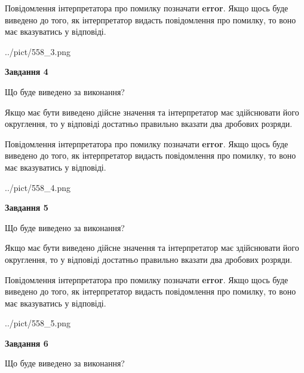 \documentclass[12pt, ukrainian]{article}
\begin{document}
{\begin {Large}
Повідомлення інтерпретатора про помилку позначати \textbf{error}.
Якщо щось буде виведено до того, як інтерпретатор видасть повідомлення про помилку, 
то воно має вказуватись у відповіді. \par

\begin{center}
	{../pict/558_3.png}
\end{center}
\newpage

{\begin {center}\textbf{Завдання 4}\end {center}}\par
Що буде виведено за виконання? \par

Якщо має бути виведено дійсне значення та інтерпретатор має здійснювати його округлення, 
то у відповіді достатньо правильно вказати два дробових розряди.

Повідомлення інтерпретатора про помилку позначати \textbf{error}.
Якщо щось буде виведено до того, як інтерпретатор видасть повідомлення про помилку, 
то воно має вказуватись у відповіді. \par

\begin{center}
	{../pict/558_4.png}
\end{center}
\newpage

{\begin {center}\textbf{Завдання 5}\end {center}}\par
Що буде виведено за виконання? \par

Якщо має бути виведено дійсне значення та інтерпретатор має здійснювати його округлення, 
то у відповіді достатньо правильно вказати два дробових розряди.

Повідомлення інтерпретатора про помилку позначати \textbf{error}.
Якщо щось буде виведено до того, як інтерпретатор видасть повідомлення про помилку, 
то воно має вказуватись у відповіді. \par

\begin{center}
	{../pict/558_5.png}
\end{center}
\newpage

{\begin {center}\textbf{Завдання 6}\end {center}}\par
Що буде виведено за виконання? \par


\end{Large}}
\end{document}
